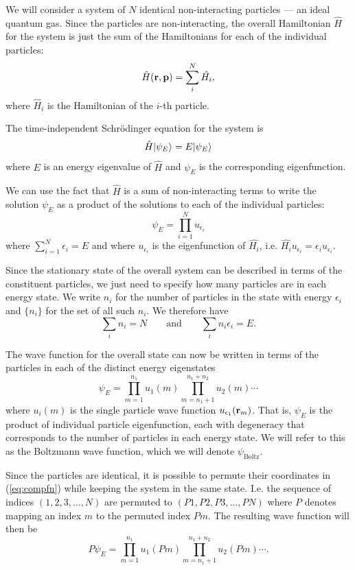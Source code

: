 \documentclass{article}
\begin{document}
We will consider a system of $N$ identical non-interacting particles --- an ideal quantum gas. Since the particles are non-interacting, the overall Hamiltonian $\hat{H}$ for the system is just the sum of the Hamiltonians for each of the individual particles:
$$
	\hat{H}({\bf r},{\bf p}) = \sum_i^N\hat{H_i},
$$
where $\hat{H}_i$ is the Hamiltonian of the $i$-th particle.

The time-independent Schr\"odinger equation for the system is
$$
	\hat{H}| \psi_E \rangle = E| \psi_E \rangle
$$
where $E$ is an energy eigenvalue of $\hat{H}$ and $\psi_E$ is the corresponding eigenfunction.

We can use the fact that $\hat{H}$ is a sum of non-interacting terms to write the solution $\psi_E$ as a product of the solutions to each of the individual particles: 
$$
	\psi_E = \prod_{i=1}^Nu_{\epsilon_i}
$$
where $\sum_{i=1}^N\epsilon_i = E$ and where $u_{\epsilon_i}$ is the eigenfunction of $\hat{H_i}$, i.e. $\hat{H_i}u_{\epsilon_i}={\epsilon_i}u_{\epsilon_i}$.

Since the stationary state of the overall system can be described in terms of the constituent particles, we just need to specify how many particles are in each energy state. We write $n_i$ for the number of particles in the state with energy $\epsilon_i$ and $\{n_i\}$ for the set of all such $n_i$. We therefore have
$$
	\sum_i n_i =N \qquad \text{and} \qquad \sum_in_i\epsilon_i = E.
$$

The wave function for the overall state can now be written in terms of the particles in each of the distinct energy eigenstates
\begin{equation}
	\psi_E = \prod_{m=1}^{n_1}u_1(m)\prod_{m=n_1+1}^{n_1+n_2}u_2(m)\cdots
	\label{eq:compfn}
\end{equation}
where $u_i(m)$ is the single particle wave function $u_{\epsilon_1}({\bf r}_m)$.
That is, $\psi_E$ is the product of individual particle eigenfunction, each with degeneracy that corresponds to the number of particles in each energy state.
We will refer to this as the Boltzmann wave function, which we will denote $\psi_\text{Boltz}$.

Since the particles are identical, it is possible to permute their coordinates in (\ref{eq:compfn}) while keeping the system in the same state. I.e. the sequence of indices $(1,2,3,\ldots,N)$ are permuted to $(P1,P2,P3,\ldots,PN)$ where $P$ denotes mapping an index $m$ to the permuted index $Pm$. The resulting wave function will then be
\begin{equation}
	P\psi_E = \prod_{m=1}^{n_1}u_1(Pm)\prod_{m=n_1+1}^{n_1+n_2}u_2(Pm)\cdots.
	\label{eq:permfn}
\end{equation}
\end{document}
